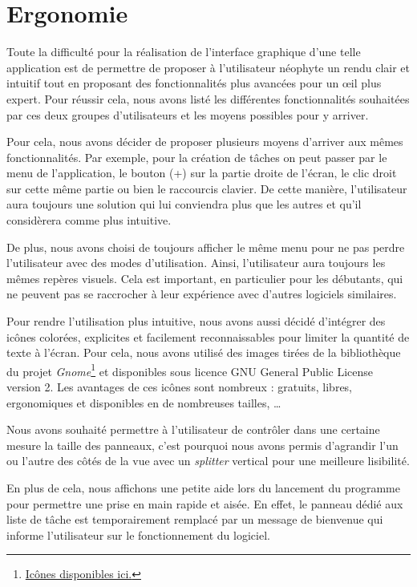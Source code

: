 	
	\section{Ergonomie}
		Toute la difficulté pour la réalisation de l'interface graphique d'une telle application est de permettre de proposer à l'utilisateur néophyte un rendu clair et intuitif tout en proposant des fonctionnalités plus avancées pour un {\oe}il plus expert. Pour réussir cela, nous avons listé les différentes fonctionnalités souhaitées par ces deux groupes d'utilisateurs et les moyens possibles pour y arriver.
		
		Pour cela, nous avons décider de proposer plusieurs moyens d'arriver aux mêmes fonctionnalités. Par exemple, pour la création de tâches on peut passer par le menu de l'application, le bouton (+) sur la partie droite de l'écran, le clic droit sur cette même partie ou bien le raccourcis clavier. De cette manière, l'utilisateur aura toujours une solution qui lui conviendra plus que les autres et qu'il considèrera comme plus intuitive.
		
		De plus, nous avons choisi de toujours afficher le même menu pour ne pas perdre l'utilisateur avec des \og modes \fg d'utilisation. Ainsi, l'utilisateur aura toujours les mêmes repères visuels. Cela est important, en particulier pour les débutants, qui ne peuvent pas se raccrocher à leur expérience avec d'autres logiciels similaires.\newline
		
		Pour rendre l'utilisation plus intuitive, nous avons aussi décidé d'intégrer des icônes colorées, explicites et facilement reconnaissables pour limiter la quantité de texte à l'écran. Pour cela, nous avons utilisé des images tirées de la bibliothèque du projet \emph{Gnome}\footnote{\href{https://commons.wikimedia.org/wiki/GNOME_Desktop_icons}{Icônes disponibles ici.}} et disponibles sous licence GNU General Public License version 2. Les avantages de ces icônes sont nombreux : gratuits, libres, ergonomiques et disponibles en de nombreuses tailles, \dots \newline
		
		Nous avons souhaité permettre à l'utilisateur de contrôler dans une certaine mesure la taille des panneaux, c'est pourquoi nous avons permis d'agrandir l'un ou l'autre des côtés de la vue avec un \emph{splitter} vertical pour une meilleure lisibilité.
		
		En plus de cela, nous affichons une petite aide lors du lancement du programme pour permettre une prise en main rapide et aisée. En effet, le panneau dédié aux liste de tâche est temporairement remplacé par un message de bienvenue qui informe l'utilisateur sur le fonctionnement du logiciel.
		
